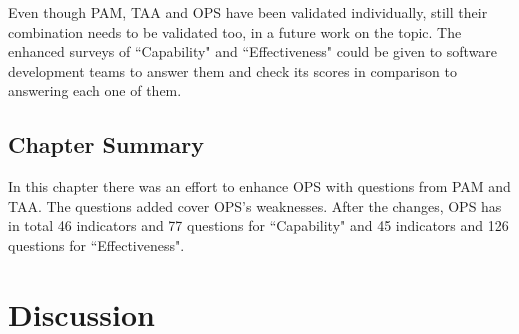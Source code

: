 

Even though PAM, TAA and OPS have been validated individually, still their combination needs to be validated too, in a future work on the topic. The enhanced surveys of ``Capability" and ``Effectiveness" could be given to software development teams to answer them and check its scores in comparison to answering each one of them.  

\section{Chapter Summary}
In this chapter there was an effort to enhance OPS with questions from PAM and TAA. The questions added cover OPS's weaknesses. After the changes, OPS has in total 46 indicators and 77 questions for ``Capability" and 45 indicators and 126 questions for ``Effectiveness".


\chapter{Discussion}
\label{ch:discussion}







